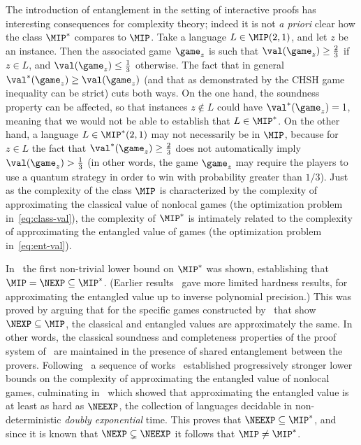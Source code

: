 The introduction of entanglement in the setting of interactive proofs has interesting consequences for complexity theory; indeed it is not \emph{a priori} clear how the class $\MIP^*$ compares to $\MIP$. Take a language $L\in \MIP(2,1)$, and let $z$ be an instance. Then the associated game $\game_z$ is such that $\val(\game_z)\geq\frac{2}{3}$ if $z\in L$, and $\val(\game_z)\leq\frac{1}{3}$ otherwise. The fact that in general $\val^*(\game_z) \geq \val(\game_z)$ (and that as demonstrated by the CHSH game inequality can be strict) cuts both ways. On the one hand, the soundness property can be affected, so that instances $z\notin L$ could have $\val^*(\game_z) = 1$, meaning that we would not be able to establish that $L \in \MIP^*$.
On the other hand, a language $L \in \MIP^*(2,1)$ may not necessarily be in $\MIP$, because for $z\in L$ the fact that $\val^*(\game_z)\geq\frac{2}{3}$ does not automatically imply $\val(\game_z)> \frac{1}{3}$ (in other words, the game $\game_z$ may require the players to use a quantum strategy in order to win with probability greater than $1/3$). Just as the complexity of the class $\MIP$ is characterized by the complexity of approximating the classical value of nonlocal games (the optimization problem in~\eqref{eq:class-val}), the complexity of $\MIP^*$ is intimately related to the complexity of approximating the entangled value of games (the optimization problem in~\eqref{eq:ent-val}).


In~\cite{ito2012multi} the first non-trivial lower bound on $\MIP^*$ was shown, establishing that $\MIP = \NEXP \subseteq \MIP^*$. (Earlier results~\cite{kempe2011entangled,ito2009oracularization} gave more limited hardness results, for approximating the entangled value up to inverse polynomial precision.) This was proved by arguing that for the specific games constructed by~\cite{babai1991non} that show $\NEXP \subseteq \MIP$, the classical and entangled values are approximately the same. In other words, the classical soundness and completeness properties of the proof system of~\cite{babai1991non} are maintained in the presence of shared entanglement between the provers. 
Following~\cite{ito2012multi} a sequence of works~\cite{vidick2016three,ji2016classical,natarajan2018two,ji2017compression,natarajan2018low,fitzsimons2018quantum} established progressively stronger lower bounds on the complexity of approximating the entangled value of nonlocal games, culminating in~\cite{NW19} which showed that approximating the entangled value is at least as hard as $\NEEXP$, the collection of languages decidable in non-deterministic \emph{doubly exponential} time. This proves that $\NEEXP \subseteq \MIP^*$, and since it is known that $\NEXP\subsetneq \NEEXP$ it follows that $\MIP \neq \MIP^*$.




